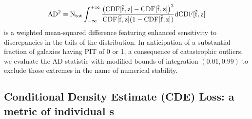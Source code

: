 \begin{equation} \eqlabel{eq:ad}
\rm{AD}^2 \equiv N_{tot}\int_{-\infty}^{+\infty} \frac{\big(\rm{CDF}[\hat{f}, z] - \rm{CDF}[\tilde{f}, z]\big)^2} {\rm{CDF}[\tilde{f}, z] (1 -\rm{CDF}[\tilde{f}, z])} \mathrm{d}\rm{CDF}[\tilde{f}, z]
\end{equation}
is a weighted mean-squared difference featuring enhanced sensitivity to discrepancies in the tails of the distribution.
In anticipation of a substantial fraction of galaxies having PIT of 0 or 1, a consequence of catastrophic outliers, we evaluate the AD statistic with modified bounds of integration $(0.01, 0.99)$ to exclude those extremes in the name of numerical stability.


\subsection{Conditional Density Estimate (CDE) Loss: a metric of individual \pzpdf s}

